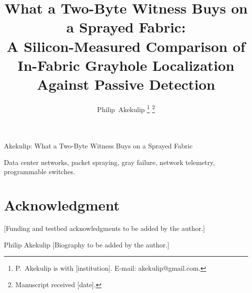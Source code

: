 \documentclass[journal]{IEEEtran}
\begin{document}
\title{What a Two-Byte Witness Buys on a Sprayed Fabric:\\ A Silicon-Measured Comparison of In-Fabric Grayhole Localization Against Passive Detection}

\author{Philip~Akekulip%
\thanks{P.~Akekulip is with [institution]. E-mail: akekulip@gmail.com.}%
\thanks{Manuscript received [date].}}

%
{Akekulip: What a Two-Byte Witness Buys on a Sprayed Fabric}

\maketitle

\begin{abstract}

\end{abstract}

\begin{IEEEkeywords}
Data center networks, packet spraying, gray failure, network telemetry, programmable switches.
\end{IEEEkeywords}














\section*{Acknowledgment}
[Funding and testbed acknowledgments to be added by the author.]




\begin{IEEEbiographynophoto}{Philip Akekulip}
[Biography to be added by the author.]
\end{IEEEbiographynophoto}
\end{document}

